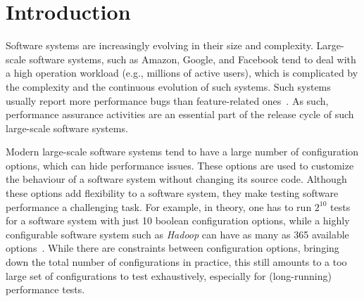 
\section{Introduction}
\label{sec:intro}
Software systems are increasingly evolving in their size and complexity.
Large-scale software systems, such as Amazon, Google, and Facebook tend to deal with a high operation workload (e.g., millions of active users), which is complicated by the complexity and the continuous evolution of such systems. Such systems usually report more performance bugs than feature-related ones~\cite{weyuker2000experience}. As such, performance assurance activities are an essential part of the release cycle of such large-scale software systems.

Modern large-scale software systems tend to have a large number of configuration options, which can hide performance issues. %
These options are used to customize the behaviour of a software system without changing its source code. Although these options add flexibility to a software system, they make testing software performance a challenging task. For example, in theory, one has to run $2^
{10}$ tests for a software system with just 10 boolean configuration options, while a highly configurable software system such as \emph{Hadoop} can have as many as 365 available options~\cite{tse}. While there are constraints between configuration options, bringing down the total number of configurations in practice, this still amounts to a too large set of configurations to test exhaustively, especially for (long-running) performance tests.
 
